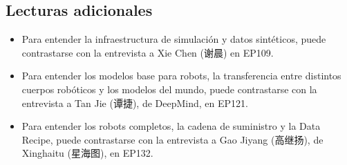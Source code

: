\subsection{Lecturas adicionales}

\begin{itemize}
\item Para entender la infraestructura de simulación y datos sintéticos, puede contrastarse con la entrevista a Xie Chen (谢晨) en EP109.
\item Para entender los modelos base para robots, la transferencia entre distintos cuerpos robóticos y los modelos del mundo, puede contrastarse con la entrevista a Tan Jie (谭捷), de DeepMind, en EP121.
\item Para entender los robots completos, la cadena de suministro y la Data Recipe, puede contrastarse con la entrevista a Gao Jiyang (高继扬), de Xinghaitu (星海图), en EP132.
\end{itemize}


